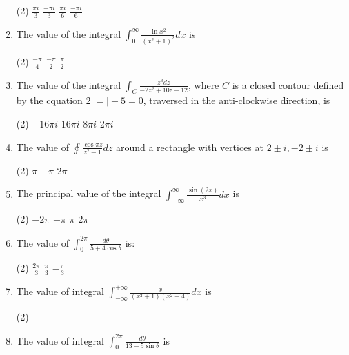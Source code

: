 \begin{enumerate}
	\begin{tasks}(2)
		\task[\textbf{a.}]$\frac{\pi i}{3}$
		\task[\textbf{b.}]$\frac{-\pi i}{3}$
		\task[\textbf{c.}]$\frac{\pi i}{6}$
		\task[\textbf{d.}] $\frac{-\pi i}{6}$
	\end{tasks}
	\item The value of the integral $\int_{0}^{\infty} \frac{\ln x^{2}}{\left(x^{2}+1\right)^{2}} d x$ is
	\begin{tasks}(2)
		\task[\textbf{b.}] $\frac{-\pi}{4}$
		\task[\textbf{c.}]$\frac{-\pi}{2}$
		\task[\textbf{d.}] $\frac{\pi}{2}$
	\end{tasks}
	\item The value of the integral $\int_{C} \frac{z^{3} d z}{-2 z^{2}+10 z-12}$, where $C$ is a closed contour defined by the cquation $2|=|-5=0$, traversed in the anti-clockwise direction, is
	\begin{tasks}(2)
		\task[\textbf{a.}]$-16 \pi i$
		\task[\textbf{b.}]$16 \pi i$
		\task[\textbf{c.}]$8 \pi i$
		\task[\textbf{d.}] $2 \pi i$
	\end{tasks}
	\item The value of $\oint \frac{\cos \pi z}{z^{2}-1} d z$ around a rectangle with vertices at $2 \pm i,-2 \pm i$ is
	\begin{tasks}(2)
		\task[\textbf{a.}]$\pi$
		\task[\textbf{b.}] $-\pi$
		\task[\textbf{c.}]$2 \pi$
	\end{tasks}
	\item The principal value of the integral $\int_{-\infty}^{\infty} \frac{\sin (2 x)}{x^{3}} d x$ is
	\begin{tasks}(2)
		\task[\textbf{a.}]$-2 \pi$
		\task[\textbf{b.}]$-\pi$
		\task[\textbf{c.}] $\pi$
		\task[\textbf{d.}] $2 \pi$
	\end{tasks}
	\item The value of $\int_{0}^{2 \pi} \frac{d \theta}{5+4 \cos \theta}$ is:
	\begin{tasks}(2)
		\task[\textbf{a.}]$\frac{2 \pi}{3}$
		\task[\textbf{b.}]$\frac{\pi}{3}$
		\task[\textbf{c.}]$-\frac{\pi}{3}$
	\end{tasks}
	\item The value of integral $\int_{-\infty}^{+\infty} \frac{x}{\left(x^{2}+1\right)\left(x^{2}+4\right)} d x$ is
	\begin{tasks}(2)
	\end{tasks}
	\item The value of integral $\int_{0}^{2 \pi} \frac{d \theta}{13-5 \sin \theta}$ is

\end{enumerate}
